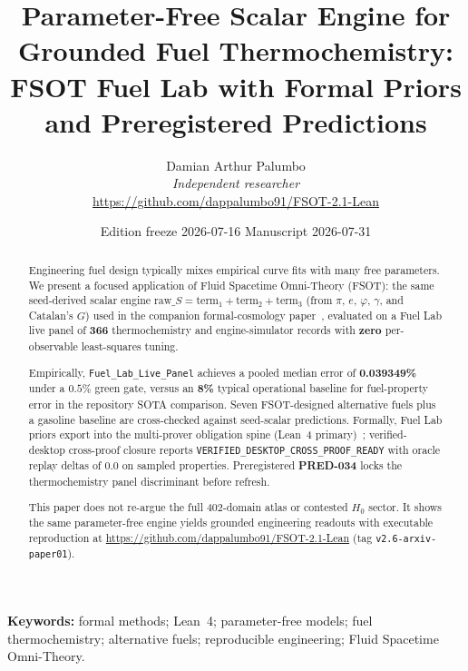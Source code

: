 \documentclass[11pt,a4paper]{article}
\title{Parameter-Free Scalar Engine for Grounded Fuel Thermochemistry:\\
FSOT Fuel Lab with Formal Priors and Preregistered Predictions}
\author{Damian Arthur Palumbo\\
\textit{Independent researcher}\\[0.5em]
\url{https://github.com/dappalumbo91/FSOT-2.1-Lean}}
\date{Edition freeze 2026-07-16 \quad Manuscript 2026-07-31}
\begin{document}
\maketitle

\begin{abstract}
Engineering fuel design typically mixes empirical curve fits with many free
parameters.
We present a focused application of Fluid Spacetime Omni-Theory (FSOT): the same
seed-derived scalar engine
$\mathrm{raw}\_S=\mathrm{term}_1+\mathrm{term}_2+\mathrm{term}_3$
(from $\pi$, $e$, $\varphi$, $\gamma$, and Catalan's $G$) used in the companion
formal-cosmology paper~\cite{FSOTPaper01}, evaluated on a Fuel Lab live panel of
\textbf{366} thermochemistry and engine-simulator records with
\textbf{zero} per-observable least-squares tuning.

Empirically, \texttt{Fuel\_Lab\_Live\_Panel} achieves a pooled median error of
\textbf{0.039349\%} under a $0.5\%$ green gate, versus an \textbf{8\%} typical
operational baseline for fuel-property error in the repository SOTA comparison.
Seven FSOT-designed alternative fuels plus a gasoline baseline are cross-checked
against seed-scalar predictions.
Formally, Fuel Lab priors export into the multi-prover obligation spine
(Lean~4 primary)~\cite{Lean4,Mathlib}; verified-desktop cross-proof closure
reports \texttt{VERIFIED\_DESKTOP\_CROSS\_PROOF\_READY} with oracle replay
deltas of $0.0$ on sampled properties.
Preregistered \textbf{PRED-034} locks the thermochemistry panel discriminant
before refresh.

This paper does not re-argue the full 402-domain atlas or contested $H_0$ sector.
It shows the same parameter-free engine yields grounded engineering readouts
with executable reproduction at
\url{https://github.com/dappalumbo91/FSOT-2.1-Lean}
(tag \texttt{v2.6-arxiv-paper01}).
\end{abstract}

\noindent\textbf{Keywords:}
formal methods; Lean~4; parameter-free models; fuel thermochemistry;
alternative fuels; reproducible engineering; Fluid Spacetime Omni-Theory.
\end{document}
